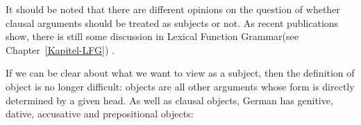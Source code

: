 
It should be noted that there are different opinions on the question of whether clausal arguments should be treated as subjects or
not. As recent publications show, there is still some discussion in Lexical Function
Grammar\indexlfg (see Chapter~\ref{Kapitel-LFG}) \citep*{DL2000a-u,Berman2003b-u,Berman2007a-u,AMM2005a-u,Forst2006a-u}. 

If we can be clear about what we want to view as a subject, then the definition of object is no longer difficult: objects are all other
arguments whose form is directly determined by a given head. As well as clausal objects, German has genitive, dative, accusative and prepositional
objects:

